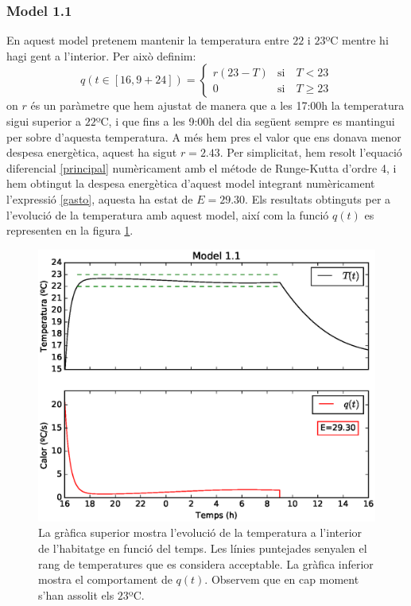 \documentclass[11pt]{article}
\begin{document}
	\subsubsection*{Model 1.1}
	En aquest model pretenem mantenir la temperatura entre $22$ i $23$ºC mentre hi hagi gent a l'interior. Per això definim:
	\begin{equation}\label{model11}
	 q(t\in[16,9+24])=
		\begin{cases}
		r(23-T)&\text{si}\quad T<23\\
		0&\text{si}\quad T\geq23
		
		\end{cases}
	\end{equation}
	on $r$ és un paràmetre que hem ajustat de manera que a les 17:00h la temperatura sigui superior a $22$ºC, i que fins a les 9:00h del dia següent sempre es mantingui per sobre d'aquesta temperatura. A més hem pres el valor que ens donava menor despesa energètica, aquest ha sigut $r=2.43$. Per simplicitat, hem resolt l'equació diferencial \eqref{principal} numèricament amb el métode de Runge-Kutta d'ordre 4, i hem  obtingut la despesa energètica d'aquest model integrant numèricament l'expressió \eqref{gasto}, aquesta ha estat de $E=29.30$. Els resultats obtinguts per a l'evolució de la temperatura amb aquest model, així com la funció $q(t)$ es representen en la figura \ref{figmodel11}. 
	\begin{figure}[h!]
		\centering
		\includegraphics[width=12cm]{model11.eps}
		\caption{La gràfica superior mostra l'evolució de la temperatura a l'interior de l'habitatge en funció del temps. Les línies puntejades senyalen el rang de temperatures que es considera acceptable. La gràfica inferior mostra el comportament de $q(t)$. Observem que en cap moment s'han assolit els $23$ºC.}
		\label{figmodel11}
	\end{figure}
\end{document}

